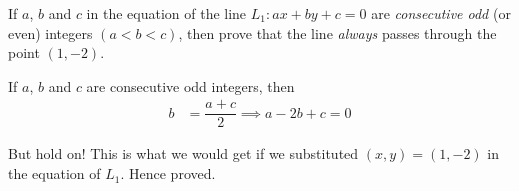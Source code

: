 

\question[3] If $a$, $b$ and $c$ in the equation of the line $L_1: ax+by+c=0$ are 
\textit{consecutive odd} (or even) integers $(a<b<c)$, then prove that the line \textit{always} passes
through the point $(1,-2)$. 


\ifprintanswers
\fi 

\begin{solution}[\halfpage]
  If $a$, $b$ and $c$ are consecutive odd integers, then 
  \begin{align}
    b &= \dfrac{a+c}{2}\implies a-2b + c = 0
  \end{align}

  But hold on! This is what we would get if we substituted $(x,y)=(1,-2)$ in 
  the equation of $L_1$. Hence proved.
\end{solution}
